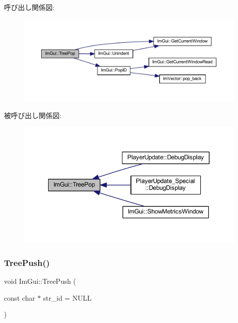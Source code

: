 呼び出し関係図\+:\nopagebreak
\begin{figure}[H]
\begin{center}
\leavevmode
\includegraphics[width=350pt]{namespace_im_gui_a41ecf265e5f678c78fc9c30b3cf2077f_cgraph}
\end{center}
\end{figure}
被呼び出し関係図\+:\nopagebreak
\begin{figure}[H]
\begin{center}
\leavevmode
\includegraphics[width=341pt]{namespace_im_gui_a41ecf265e5f678c78fc9c30b3cf2077f_icgraph}
\end{center}
\end{figure}
\mbox{\label{namespace_im_gui_a596151d99bca5cc0b6393809c1e07af5}} 
\subsubsection{\texorpdfstring{Tree\+Push()}{TreePush()}\hspace{0.1cm}{\footnotesize\ttfamily [1/2]}}
{\footnotesize\ttfamily void Im\+Gui\+::\+Tree\+Push (\begin{DoxyParamCaption}\item[{const char $\ast$}]{str\+\_\+id = {\ttfamily NULL} }\end{DoxyParamCaption})}




